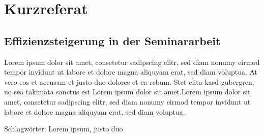 \newpage
\section*{Kurzreferat}

  \subsection*{Effizienzsteigerung in der Seminararbeit}

    Lorem ipsum dolor sit amet, consetetur sadipscing elitr, sed diam nonumy eirmod tempor invidunt ut labore et dolore magna aliquyam erat, sed diam voluptua.
    At vero eos et accusam et justo duo dolores et ea rebum. Stet clita kasd gubergren, no sea takimata sanctus est Lorem ipsum dolor sit amet.Lorem ipsum dolor sit amet, consetetur sadipscing elitr, sed diam nonumy eirmod tempor invidunt ut labore et dolore magna aliquyam erat, sed diam voluptua.

\vspace{0.5cm}

\noindent
Schlagwörter: Lorem ipsum, justo duo
